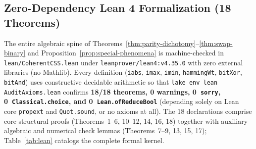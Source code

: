 \documentclass[11pt,a4paper]{article}
\theoremstyle{plain}
\theoremstyle{definition}
\begin{document}
\subsection{Zero-Dependency Lean 4 Formalization (18 Theorems)}

The entire algebraic spine of Theorems~\ref{thm:parity-dichotomy}--\ref{thm:swap-binary} and Proposition~\ref{prop:special-phenomena} is machine-checked in \texttt{lean/CoherentCSS.lean} under \texttt{leanprover/lean4:v4.35.0} with zero external libraries (no Mathlib). Every definition (\texttt{iabs}, \texttt{imax}, \texttt{imin}, \texttt{hammingWt}, \texttt{bitXor}, \texttt{bitAnd}) uses constructive decidable arithmetic so that \texttt{lake env lean AuditAxioms.lean} confirms \textbf{18/18 theorems, 0 warnings, 0~\texttt{sorry}, 0~\texttt{Classical.choice}, and 0~\texttt{Lean.ofReduceBool}} (depending solely on Lean core \texttt{propext} and \texttt{Quot.sound}, or no axioms at all). The 18 declarations comprise core structural proofs (Theorems~1--6, 10--12, 14, 16, 18) together with auxiliary algebraic and numerical check lemmas (Theorems~7--9, 13, 15, 17); Table~\ref{tab:lean} catalogs the complete formal kernel.
\end{document}
